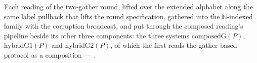 \begin{definition}
  \label{def:aba-gather-side}
  \leanok
  Each reading of the two-gather round, lifted over the extended alphabet along the same label pullback that lifts the round specification, gathered into the $\mathbb{N}$-indexed family with the corruption broadcast, and put through the composed reading's pipeline beside its other three components: the three systems $\mathrm{composedG}(P)$, $\mathrm{hybridG1}(P)$ and $\mathrm{hybridG2}(P)$, of which the first reads the gather-based protocol as a composition --- .
\end{definition}
